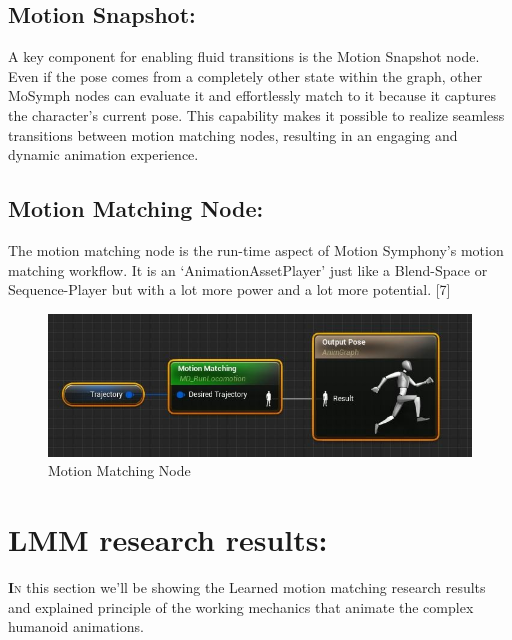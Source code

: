 \documentclass[12pt]{book}
\begin{document}
\subsection{Motion Snapshot:}
A key component for enabling fluid transitions is the Motion Snapshot node. Even if the pose
comes from a completely other state within the graph, other MoSymph nodes can evaluate it
and effortlessly match to it because it captures the character’s current pose.
This capability makes it possible to realize seamless transitions between motion matching nodes,
resulting in an engaging and dynamic animation experience.

\subsection{Motion Matching Node:}
The motion matching node is the run-time aspect of Motion Symphony’s motion matching
workflow. It is an ‘AnimationAssetPlayer’ just like a Blend-Space or Sequence-Player but with
a lot more power and a lot more potential. [7]
\begin{figure}[!h]
    \centering
    \includegraphics[scale=0.5]{./Figures/Images/Motion Symphony/MoSympMMNode.jpeg}
    \caption{Motion Matching Node}
    \label{Motion Matching Node}
\end{figure}

\section{LMM research results:}
\lettrine[findent=1pt]{\textbf{I}}{n} this section we'll be showing the Learned motion matching research results and explained principle of the working mechanics that animate the complex humanoid animations.
\label{appendix:LMM}
\end{document}
